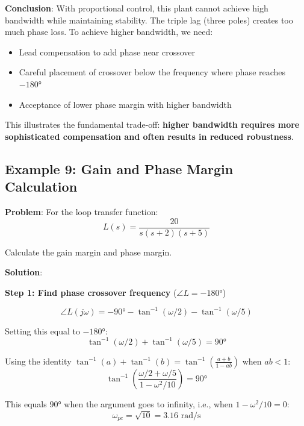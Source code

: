 \textbf{Conclusion}: With proportional control, this plant cannot achieve high bandwidth while maintaining stability. The triple lag (three poles) creates too much phase loss. To achieve higher bandwidth, we need:
\begin{itemize}
    \item Lead compensation to add phase near crossover
    \item Careful placement of crossover below the frequency where phase reaches $-180°$
    \item Acceptance of lower phase margin with higher bandwidth
\end{itemize}

This illustrates the fundamental trade-off: \textbf{higher bandwidth requires more sophisticated compensation and often results in reduced robustness}.

\subsection{Example 9: Gain and Phase Margin Calculation}

\textbf{Problem}: For the loop transfer function:
\begin{equation}
    L(s) = \frac{20}{s(s+2)(s+5)}
\end{equation}

Calculate the gain margin and phase margin.

\textbf{Solution}:

\textbf{Step 1: Find phase crossover frequency} ($\angle L = -180°$)

\begin{equation}
    \angle L(j\omega) = -90° - \tan^{-1}(\omega/2) - \tan^{-1}(\omega/5)
\end{equation}

Setting this equal to $-180°$:
\begin{equation}
    \tan^{-1}(\omega/2) + \tan^{-1}(\omega/5) = 90°
\end{equation}

Using the identity $\tan^{-1}(a) + \tan^{-1}(b) = \tan^{-1}\left(\frac{a+b}{1-ab}\right)$ when $ab < 1$:
\begin{equation}
    \tan^{-1}\left(\frac{\omega/2 + \omega/5}{1 - \omega^2/10}\right) = 90°
\end{equation}

This equals $90°$ when the argument goes to infinity, i.e., when $1 - \omega^2/10 = 0$:
\begin{equation}
    \omega_{pc} = \sqrt{10} = 3.16 \text{ rad/s}
\end{equation}


